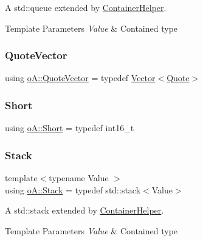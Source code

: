 A std\+::queue extended by \mbox{\hyperlink{classo_a_1_1_container_helper}{Container\+Helper}}. 


\begin{DoxyTemplParams}{Template Parameters}
{\em Value} & Contained type \\
\hline
\end{DoxyTemplParams}
\mbox{\label{namespaceo_a_a38695044d9ec0b57190f4e3fab0caffd}} 
\subsubsection{\texorpdfstring{Quote\+Vector}{QuoteVector}}
{\footnotesize\ttfamily using \mbox{\hyperlink{namespaceo_a_a38695044d9ec0b57190f4e3fab0caffd}{o\+A\+::\+Quote\+Vector}} = typedef \mbox{\hyperlink{namespaceo_a_aead0f530bdad1c2e668426680b26017f}{Vector}}$<$\mbox{\hyperlink{classo_a_1_1_quote}{Quote}}$>$}

\mbox{\label{namespaceo_a_a17d2753cd7febb25f447b0cff6cec6eb}} 
\subsubsection{\texorpdfstring{Short}{Short}}
{\footnotesize\ttfamily using \mbox{\hyperlink{namespaceo_a_a17d2753cd7febb25f447b0cff6cec6eb}{o\+A\+::\+Short}} = typedef int16\+\_\+t}

\mbox{\label{namespaceo_a_a992ff8d32ca8c60ad68cbd56834bbeec}} 
\subsubsection{\texorpdfstring{Stack}{Stack}}
{\footnotesize\ttfamily template$<$typename Value $>$ \\
using \mbox{\hyperlink{namespaceo_a_a992ff8d32ca8c60ad68cbd56834bbeec}{o\+A\+::\+Stack}} = typedef std\+::stack$<$Value$>$}



A std\+::stack extended by \mbox{\hyperlink{classo_a_1_1_container_helper}{Container\+Helper}}. 


\begin{DoxyTemplParams}{Template Parameters}
{\em Value} & Contained type \\
\hline
\end{DoxyTemplParams}
\mbox{\label{namespaceo_a_a38e502e26381eb0b98c9a03430e4dcce}} 
